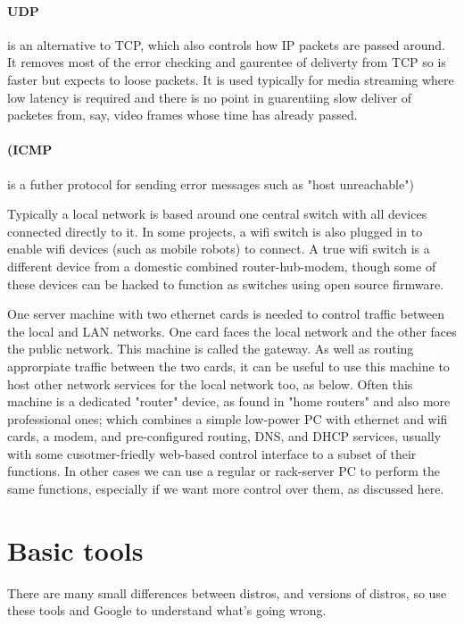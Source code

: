 \documentclass[oneside,english]{scrbook}
\begin{document}
\paragraph{UDP} is an alternative to TCP, which also controls how IP packets are passed around. It removes most of the error checking and gaurentee of deliverty from TCP so is faster but expects to loose packets. It is used typically for media streaming where low latency is required and there is no point in guarentiing slow deliver of packetes from, say, video frames whose time has already passed.

\paragraph{(ICMP} is a futher protocol for sending error messages such as "host unreachable")

Typically a local network is based around one central switch with
all devices connected directly to it. In some projects, a wifi switch
is also plugged in to enable wifi devices (such as mobile robots)
to connect. A true wifi switch is a different device from a domestic combined
router-hub-modem, though some of these devices can be hacked to function
as switches using open source firmware.

One server machine with two ethernet cards is needed to control traffic
between the local and LAN networks. One card faces the local network and the other faces the public network.  This machine is called the gateway.
As well as routing approrpiate traffic between the two cards, it can be useful to use this machine to host other network services for the local network too, as below.  Often this machine is a dedicated "router" device, as found in "home routers" and also more professional ones; which combines a simple low-power PC with ethernet and wifi cards, a modem, and pre-configured routing, DNS, and DHCP services, usually with some cusotmer-friedly web-based control interface to a subset of their functions. In other cases we can use a regular or rack-server PC to perform the same functions, especially if we want more control over them, as discussed here.

\section{Basic tools}

There are many small differences between distros, and versions of
distros, so use these tools and Google to understand what's going
wrong.
\end{document}
